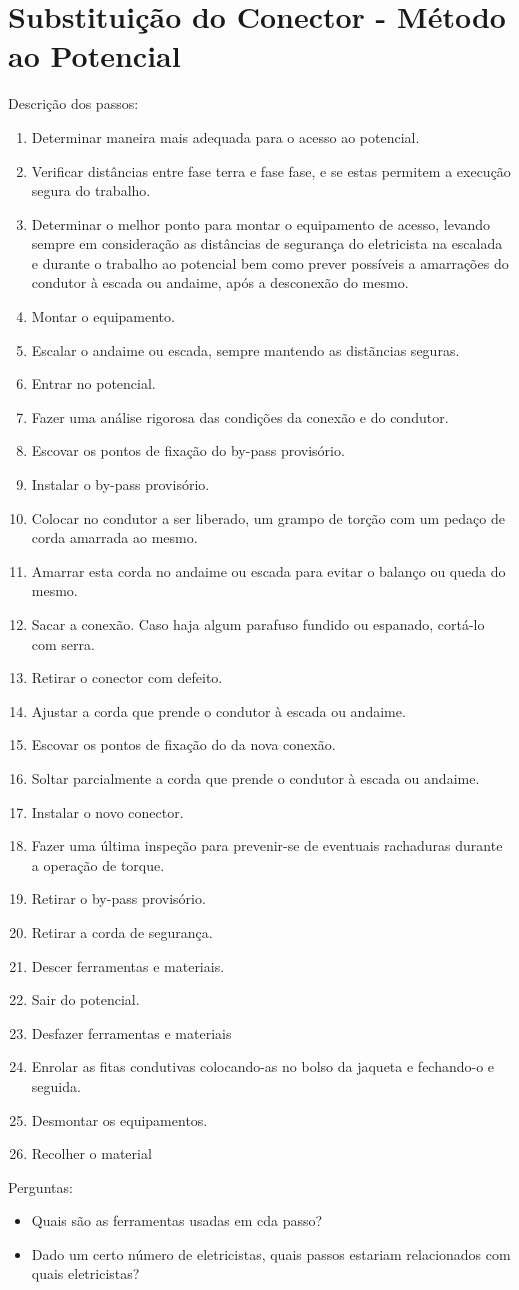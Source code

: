 \section{Substituição do Conector - Método ao Potencial}

Descrição dos passos:

\begin{enumerate}
	\item Determinar maneira mais adequada para o acesso ao potencial.
	\item Verificar distâncias entre fase terra e fase fase, e se estas permitem a execução segura do trabalho.
	\item Determinar o melhor ponto para montar o equipamento de acesso, levando sempre em consideração as distâncias de segurança do eletricista na escalada e durante o trabalho ao potencial bem como prever possíveis a amarrações do condutor à escada ou andaime, após a desconexão do mesmo.
	\item Montar o equipamento.
	\item Escalar o andaime ou escada, sempre mantendo as distãncias seguras.
	\item Entrar no potencial.
	\item Fazer uma análise rigorosa das condições da conexão e do condutor.
	\item Escovar os pontos de fixação do by-pass provisório.
	\item Instalar o by-pass provisório.
	\item Colocar no condutor a ser liberado, um grampo de torção com um pedaço de corda amarrada ao mesmo.
	\item Amarrar esta corda no andaime ou escada para evitar o balanço ou queda do mesmo.
	\item Sacar a conexão. Caso haja algum parafuso fundido ou espanado, cortá-lo com serra.
	\item Retirar o conector com defeito.
	\item Ajustar a corda que prende o condutor à escada ou andaime.
	\item Escovar os pontos de fixação do da nova conexão.
	\item Soltar parcialmente a corda que prende o condutor à escada ou andaime.
	\item Instalar o novo conector.
	\item Fazer uma última inspeção para prevenir-se de eventuais rachaduras durante a operação de torque.
	\item Retirar o by-pass provisório.
	\item Retirar a corda de segurança.
	\item Descer ferramentas e materiais.
	\item Sair do potencial.
	\item Desfazer ferramentas e materiais
	\item Enrolar as fitas condutivas colocando-as no bolso da jaqueta e fechando-o e seguida.
	\item Desmontar os equipamentos.
	\item Recolher o material
\end{enumerate}

Perguntas: 
\begin{itemize}
    \item Quais são as ferramentas usadas em cda passo?
    \item Dado um certo número de eletricistas, quais passos estariam relacionados com quais eletricistas?
\end{itemize}